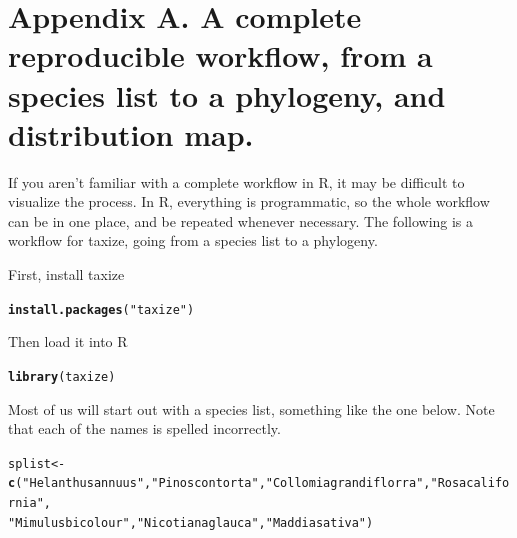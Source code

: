 \documentclass[letterpaper,superscriptaddress,showkeys,longbibliography]{revtex4-1}\usepackage[]{graphicx}\usepackage[]{color}
\makeatletter
\newcommand{\hlstr}[1]{\textcolor[rgb]{0.192,0.494,0.8}{#1}}%
\newcommand{\hlstd}[1]{\textcolor[rgb]{0.345,0.345,0.345}{#1}}%
\newcommand{\hlkwb}[1]{\textcolor[rgb]{0.69,0.353,0.396}{#1}}%
\newcommand{\hlkwd}[1]{\textcolor[rgb]{0.737,0.353,0.396}{\textbf{#1}}}%
\newenvironment{kframe}{%
 \def\at@end@of@kframe{}%
 \ifinner\ifhmode%
  \def\at@end@of@kframe{\end{minipage}}%
  \begin{minipage}{\columnwidth}%
 \fi\fi%
 \def\FrameCommand##1{\hskip\@totalleftmargin \hskip-\fboxsep
 \colorbox{shadecolor}{##1}\hskip-\fboxsep
     \hskip-\linewidth \hskip-\@totalleftmargin \hskip\columnwidth}%
 \MakeFramed {\advance\hsize-\width
   \@totalleftmargin\z@ \linewidth\hsize
   \@setminipage}}%
 {\par\unskip\endMakeFramed%
 \at@end@of@kframe}
\newenvironment{knitrout}{}{} %
\makeatother
\begin{document}
\renewcommand\thefigure{A.\arabic{figure}}    
\setcounter{figure}{0}    


\section*{Appendix A. A complete reproducible workflow, from a species list to a phylogeny, and distribution map.} 

If you aren't familiar with a complete workflow in R, it may be difficult to visualize the process. In R, everything is programmatic, so the whole workflow can be in one place, and be repeated whenever necessary. The following is a workflow for taxize, going from a species list to a phylogeny. 

First, install taxize

\begin{knitrout}
\color{fgcolor}\begin{kframe}
\begin{alltt}
\hlkwd{install.packages}\hlstd{(}\hlstr{"taxize"}\hlstd{)}
\end{alltt}
\end{kframe}
\end{knitrout}


Then load it into R

\begin{knitrout}
\color{fgcolor}\begin{kframe}
\begin{alltt}
\hlkwd{library}\hlstd{(taxize)}
\end{alltt}
\end{kframe}
\end{knitrout}


Most of us will start out with a species list, something like the one below. Note that each of the names is spelled incorrectly.

\begin{knitrout}
\color{fgcolor}\begin{kframe}
\begin{alltt}
\hlstd{splist} \hlkwb{<-} \hlkwd{c}\hlstd{(}\hlstr{"Helanthus annuus"}\hlstd{,} \hlstr{"Pinos contorta"}\hlstd{,} \hlstr{"Collomia grandiflorra"}\hlstd{,} \hlstr{"Rosa california"}\hlstd{,}
    \hlstr{"Mimulus bicolour"}\hlstd{,} \hlstr{"Nicotiana glauca"}\hlstd{,} \hlstr{"Maddia sativa"}\hlstd{)}
\end{alltt}
\end{kframe}
\end{knitrout}
\end{document}
